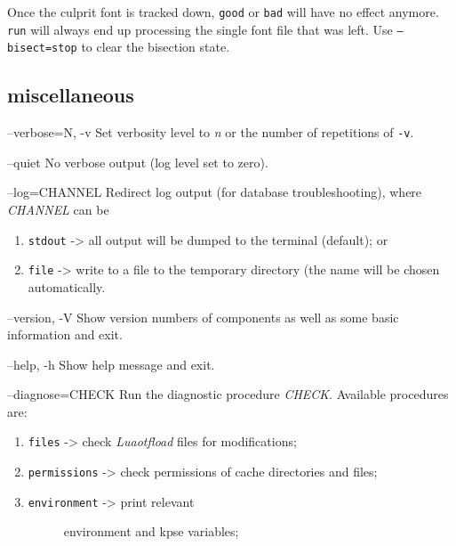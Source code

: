 \documentclass[a4paper]{article}
\providecommand*{\DUoptionlistlabel}[1]{\bf #1 \hfill}
\newenvironment{DUoptionlist}{%
    \list{}{\setlength{\labelwidth}{\DUoptionlistindent}
            \setlength{\rightmargin}{1cm}
            \setlength{\leftmargin}{\rightmargin}
            \addtolength{\leftmargin}{\labelwidth}
            \addtolength{\leftmargin}{\labelsep}
            \renewcommand{\makelabel}{\DUoptionlistlabel}}
  }
  {\endlist}
\begin{document}
\begin{DUoptionlist}
Once the culprit font is tracked down, \texttt{good}
or \texttt{bad} will have no effect anymore. \texttt{run}
will always end up processing the single font
file that was left.
Use \texttt{--bisect=stop} to clear the bisection
state.
\end{DUoptionlist}


\subsection{miscellaneous%
  \label{miscellaneous}%
}

\begin{DUoptionlist}
\item[--verbose=N, -v]  Set verbosity level to \emph{n} or the number of
repetitions of \texttt{-v}.

\item[--quiet]  No verbose output (log level set to zero).

\item[--log=CHANNEL]  Redirect log output (for database
troubleshooting), where \emph{CHANNEL} can be

\begin{enumerate}
\renewcommand{\labelenumi}{\arabic{enumi})}
\item \texttt{stdout} -> all output will be
dumped to the terminal (default); or

\item \texttt{file} -> write to a file to the temporary
directory (the name will be chosen
automatically.
\end{enumerate}

\item[--version, -V]  Show version numbers of components as well as
some basic information and exit.

\item[--help, -h]  Show help message and exit.

\item[--diagnose=CHECK]  Run the diagnostic procedure \emph{CHECK}. Available
procedures are:

\begin{enumerate}
\renewcommand{\labelenumi}{\arabic{enumi})}
\item \texttt{files} -> check \emph{Luaotfload} files for
modifications;

\item \texttt{permissions} -> check permissions of
cache directories and files;

\item 
\begin{description}
\item[{\texttt{environment} -> print relevant}] \leavevmode 
environment and kpse variables;


\end{description}
\end{enumerate}
\end{DUoptionlist}
\end{document}
